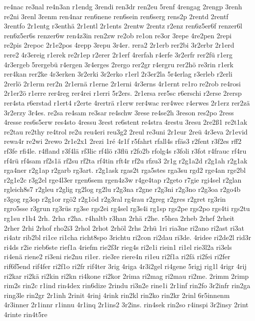 {re4nac
re3nal
re4n3an
r1endg
3rendi
ren3dr
ren2eu
5renf
4rengag
2rengp
3renh
re2ni
3renl
3renm
ren4nar
ren6nene
ren6sein
ren6serg
rens2p
2rentd
2rentf
3rentfo
2r1entg
r3enthä
2r1entl
2r1ents
2rentw
2rentz
r2enz
ren6z5er6f
renzer6l
ren6z5er6s
renzer6w
ren4z3in
ren2zw
re2ob
re1on
re3or
3repe
4re2pen
2repi
re2pis
2repoc
2r1e2pos
4repp
3repu
3r4er.
rera2
2r1erb
rer2bi
3r2erbr
2r1erd
rere2
4r3ereig
r1erek
re2r1ep
r2erer
2r1erf
4rerfah
r4erfe
3r2erfr
rer2fü
r1erg
4r3ergeb
5rergebü
r4ergen
3r4erges
2rergo
rer2gr
r4ergru
rer2hö
re3rin
r1erk
rer4kan
rer2ke
4r3erken
3r2erki
3r2erko
r1erl
2r3er2la
5r4erlag
r3erleb
r2erli
2rerlö
2r1erm
rer2n
2r1ernä
r1erne
2r1erni
4r3erns
4r1ernt
re1ro
re2rob
re4rosi
2r1er2ö
r1erre
rer4reg
rer4rei
r1erri
5r2ers.
2r1ersa
rer5sc
r6erschi
r2erse
2rersp
rer4sta
r6erstad
r1ert4
r2erte
4rerträ
r1erw
rer4wac
rer4wec
r4erwes
2r1erz
rer2zä
3r2erzy
3r4es.
re2sa
re4sam
re3sar
re4schw
3rese
re4se2h
3reson
res2po
2ress
4resse
res6s5erw
res4sto
4ressu
3rest
re6stent
re4stra
4restu
3resu
2re2ß1
re2t1ak
re2tau
re2thy
re4trol
re2u
reu4eri
reu3g2
2reul
re3uni
2r1eur
2reü
4r3eva
2r1evid
rewa4r
re2wi
2rewo
2r1e2x1
2rezi
1ré
4r1f
r5fahrt
rfall4s
rfäs3
r2fent
r3f2es
rff2
rf3fe
rfi4le.
r4fland
r3f4lä
rf3lic
rf4lö
r3flü
r2fo2b
rfolg4s
r3foli
r3fot
r4frauc
rf4ru
rf4rü
rf4sam
rf2s1ä
rf2su
rf2ta
rf4tin
rft4r
rf2u
rfzu3
2r1g
r2g1a2d
r2g1ah
r2g1ak
rga4ner
r2g1ap
r2garb
rg3art.
r2g1ask
rgas2t
rga5stes
rga3su
rgd2
rge4an
rge2bl
r2g1e2c
r3g2el
rge4l3er
rgen6sem
rgen4z3w
r4ge4tap
r2geto
r7gie
rgi4sel
r2glan
rgleich8s7
r2gleu
r2glig
rg2log
rg2lu
r2g3na
r2gne
r2g3ni
r2g3no
r2g3oa
r2go4b
r3gog
rg3op
r2g1or
rgö2
r2g1öd
r2g3ral
rg4rau
r2greg
r2gres
r2gret
rg3rin
rgro5sse
r3grun
rg3rüs
rg3se
rgs2ei
rg4sel
rg3s4i
rg1sp
rgs2pe
rgs2po
rgs4ti
rgs2tu
rg1su
r1h4
2rh.
2rha
r2ha.
r4haltb
r3han
2rhä
r2he.
r5hea
2rheb
2rhef
2rheit
2rher
2rhi
2rhof
rho2i3
2rhol
2rhot
2rhöl
2rhs
2rhü
1ri
ria3ne
ri2ano
ri2ast
ri3at
ri4atr
rib2bl
ri1ce
ri1cha
richt8spo
3richtu
ri2con
ri2dau
ri3de.
4ridee
ri2de2l
rid3r
ri4ds
r2ie
rieb6ste
rief1a
4riefm
rie2f3r
rieg4s
ri2e1i
riein1
ri1el
rie3l2a
ri3els
ri4enä
riene2
ri3eni
rie2nu
ri1er.
rie3re
riere4n
ri1eu
ri2f1a
ri2fä
ri2fei
ri2fer
rif6f5end
rif4fer
ri2f1o
ri2fr
rif4ter
3rig
4riga
4r3i2gel
ri4gene
5rigj
rig1l
4rigr
4rij
ri2kar
ri2kä
ri2kin
ri2kn
ri4kone
ri2kor
2rima
ri2mag
ri2mau
ri2me.
2rimm
2rimp
rim2s
rin2c
r1ind
rin4dex
rin6dize
2rindu
ri3n2e
rine1i
2r1inf
rin2fo
3r2infr
rin2ga
ring3le
rin2gr
2r1inh
2rinit
4rinj
4rink
rin2kl
rin2ko
rin2kr
2rinl
6r5innenm
4r3inner
2r1innr
r1innu
4r1inq
2r1ins2
3r2ins.
rin4sek
rin2so
r4inspi
3r2insy
2rint
4rinte
rin4t5re
}
